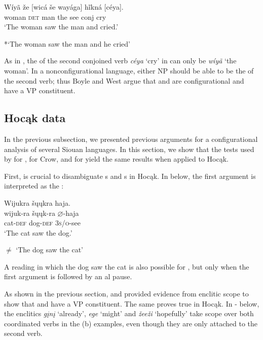 \documentclass[output=paper]{LSP/langsci}
\begin{document}
\begin{exe}
\ex\label{ex:jrs:30} \gll W\'iy\~a 	 \v{z}e 		[wic\'a 	\v{s}e 	way\'aga] h\~ikn\'a 	[c\'eya]. \\
woman 	\textsc{det} 	man 		the see 				conj 		cry \\
\trans `The woman saw the man and cried.'

*`The woman saw the man and he cried' \citep[34]{West2003}
\end{exe}

As in , the  of the second conjoined verb \textit{c\'eya} `cry' in  can only be \textit{w\'iy\~a} `the woman'.  In a nonconfigurational language, either NP should be able to be the  of the second verb; thus Boyle and West argue that  and  are configurational and have a VP constituent.

\subsection{Hocąk data}

In the previous subsection, we presented previous arguments for a configurational analysis of several Siouan languages.  In this section, we show that the tests used by \citet{Boyle2007} for , \citet{Graczyk1991a} for Crow, and \citet{West2003} for  yield the same results when applied to Hocąk.
	
First,  is crucial to disambiguate s and s in Hocąk.  In  below, the first argument is interpreted as the :

\begin{exe}
\ex\label{ex:jrs:31} 
\glll Wijukra	\v{s}\k{u}\k{u}kra 		haja.\\
wijuk-ra 		\v{s}\k{u}\k{u}k-ra 		$\varnothing$-haja \\
cat-\textsc{def} 		dog-\textsc{def} 	\textsc{3s/o}-see \\
\trans `The cat saw the dog.'

$\neq$ `The dog saw the cat'
\end{exe}

A reading in which the dog saw the cat is also possible for , but only when the first argument is followed by an al pause.
	
As shown in the previous section, \citet{Boyle2007} and \citet{West2003} provided evidence from enclitic scope to show that  and  have a VP constituent.  The same proves true in Hocąk.  In - below, the enclitics \textit{g\k{i}n\k{i}} `already', \textit{ege} `might' and \textit{\v{z}ee\v{z}i} `hopefully' take scope over both coordinated verbs in the (b) examples, even though they are only attached to the second verb.
\end{document}
